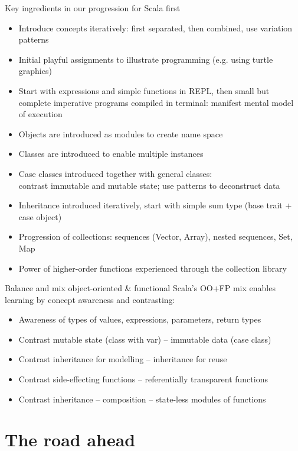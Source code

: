 \documentclass[aspectratio=169]{beamer}
\newcommand{\Section}[1]{\titleimagecolor{red}\section{#1}}
\newenvironment{Slide}[1]%
  {\begin{frame}[environment=Slide]{#1}}
  {\end{frame}}%
\begin{document}
\begin{Slide}{Key ingredients in our progression for Scala first}
 \begin{itemize}
 \item  Introduce concepts iteratively: first separated, then combined,  use variation patterns  
 \item Initial playful assignments to illustrate programming (e.g. using turtle graphics)
 \item Start with expressions and simple functions in REPL, then small but complete imperative programs compiled in terminal: manifest mental model of execution
  \item Objects are introduced as modules to create name space
  \item Classes are introduced to enable multiple instances
  \item Case classes introduced together with general classes: \\
   contrast immutable and mutable state; use patterns to deconstruct data
  \item Inheritance introduced iteratively, start with simple sum type (base trait + case object)
  \item Progression of collections: sequences (Vector, Array), nested sequences, Set, Map 
  \item Power of higher-order functions experienced through the collection library
\end{itemize}
\end{Slide}  


\begin{Slide}{Balance and mix object-oriented \& functional}
  Scala's OO+FP mix enables learning by concept awareness and contrasting:
  \begin{itemize}
    \item Awareness of types of values, expressions, parameters, return types
    \item Contrast mutable state (class with var) -- immutable data (case class)
    \item Contrast inheritance for modelling -- inheritance for reuse
    \item Contrast side-effecting functions -- referentially transparent functions
    \item Contrast inheritance -- composition -- state-less modules of functions
  \end{itemize}
\end{Slide}  


\Section{The road ahead}
\end{document}

